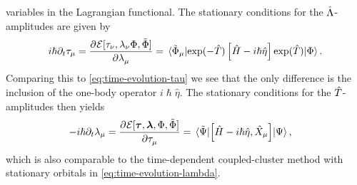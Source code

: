         variables in the Lagrangian functional.
        The stationary conditions for the $\hat{\Lambda}$-amplitudes are given by
        \begin{align}
            i\hslash\partial_t \clustamp_{\mu}
            = \dpd{\mathcal{E}[
                \clustamp_{\nu}, \clustlamp_{\nu}
                \slat, \tilde{\slat}
            ]}{\clustlamp_{\mu}}
            =
            \mel*{\tilde{\slat}_{\mu}}{
                \exponential(-\clust)\brak{
                    \hamil
                    - i\hslash\hat{\eta}
                }\exponential(\clust)
            }{\slat}.
        \end{align}
        Comparing this to \autoref{eq:time-evolution-tau} we see that the
        only difference is the inclusion of the one-body operator
        $i\hslash\hat{\eta}$.
        The stationary conditions for the $\hat{T}$-amplitudes then yields
        \begin{align}
            -i\hslash\partial_t\clustlamp_{\mu}
            &=
            \dpd{
                \mathcal{E}[
                    \vfg{\clustamp}, \vfg{\clustlamp},
                    \slat, \tilde{\slat}
                ]
            }{\clustamp_{\mu}}
            =
            \mel*{\tilde{\Psi}}{
                \com{
                    \hamil
                    - i\hslash\hat{\eta}
                }{
                    \hat{X}_{\mu}
                }
            }{\Psi},
        \end{align}
        which is also comparable to the time-dependent coupled-cluster
        method with stationary orbitals in
        \autoref{eq:time-evolution-lambda}.

